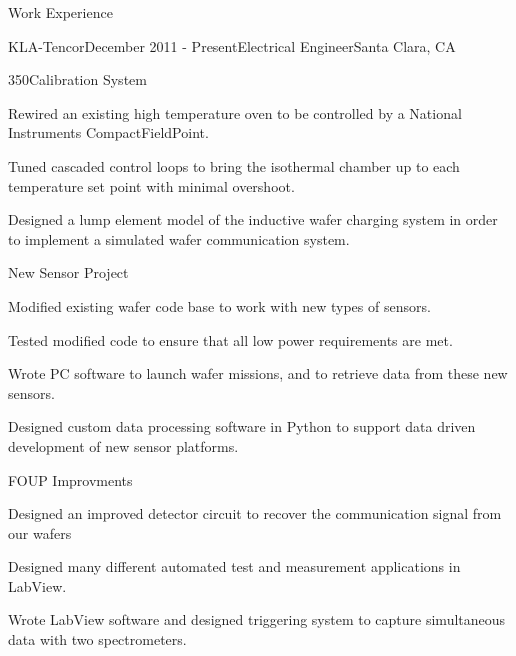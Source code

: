 \documentclass{resume} %
\begin{document}

\begin{rSection}{Work Experience}

\begin{rSubsection}{KLA-Tencor}{December 2011 - Present}{Electrical Engineer}{Santa Clara, CA}

\begin{rWorkProject}{350\celsius \space Calibration System}
\item Rewired an existing high temperature oven to be controlled by a National Instruments CompactFieldPoint.
\item Tuned cascaded control loops to bring the isothermal chamber up to each temperature set point with minimal overshoot.
\item Designed a lump element model of the inductive wafer charging system in order to implement a simulated wafer communication system.
\end{rWorkProject}

\begin{rWorkProject}{New Sensor Project}
\item Modified existing wafer code base to work with new types of sensors.

\item Tested modified code to ensure that all low power requirements are met.
\item Wrote PC software to launch wafer missions, and to retrieve data from these new sensors.
\item Designed custom data processing software in Python to support data driven development of new sensor platforms.
\end{rWorkProject}

\begin{rWorkProject}{FOUP Improvments}
\item Designed an improved detector circuit to recover the communication signal from our wafers
\item 
\end{rWorkProject}

\item Designed many different automated test and measurement applications in LabView.
\item Wrote LabView software and designed triggering system to capture simultaneous data with two spectrometers.
\end{rSubsection}


\end{rSection}
\end{document}
